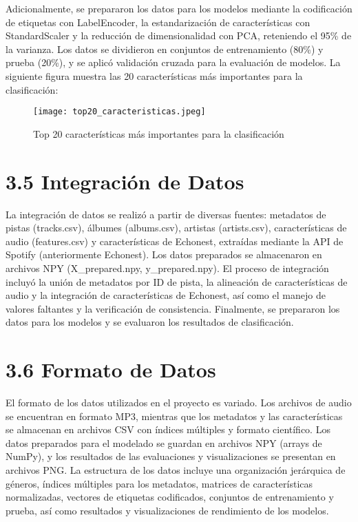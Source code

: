 \documentclass{article}
\begin{document}
Adicionalmente, se prepararon los datos para los modelos mediante la codificación de etiquetas con LabelEncoder, la estandarización de características con StandardScaler y la reducción de dimensionalidad con PCA, reteniendo el 95\% de la varianza. Los datos se dividieron en conjuntos de entrenamiento (80\%) y prueba (20\%), y se aplicó validación cruzada para la evaluación de modelos. La siguiente figura muestra las 20 características más importantes para la clasificación:

\begin{figure}[H]
    \centering
    \texttt{[image: top20\_caracteristicas.jpeg]}
    \caption{Top 20 características más importantes para la clasificación}
    \label{fig:top20_caracteristicas}
\end{figure}

\section*{3.5 Integración de Datos}
La integración de datos se realizó a partir de diversas fuentes: metadatos de pistas (tracks.csv), álbumes (albums.csv), artistas (artists.csv), características de audio (features.csv) y características de Echonest, extraídas mediante la API de Spotify (anteriormente Echonest). Los datos preparados se almacenaron en archivos NPY (X\_prepared.npy, y\_prepared.npy). El proceso de integración incluyó la unión de metadatos por ID de pista, la alineación de características de audio y la integración de características de Echonest, así como el manejo de valores faltantes y la verificación de consistencia. Finalmente, se prepararon los datos para los modelos y se evaluaron los resultados de clasificación.

\section*{3.6 Formato de Datos}
El formato de los datos utilizados en el proyecto es variado. Los archivos de audio se encuentran en formato MP3, mientras que los metadatos y las características se almacenan en archivos CSV con índices múltiples y formato científico. Los datos preparados para el modelado se guardan en archivos NPY (arrays de NumPy), y los resultados de las evaluaciones y visualizaciones se presentan en archivos PNG. La estructura de los datos incluye una organización jerárquica de géneros, índices múltiples para los metadatos, matrices de características normalizadas, vectores de etiquetas codificados, conjuntos de entrenamiento y prueba, así como resultados y visualizaciones de rendimiento de los modelos.
\end{document}
